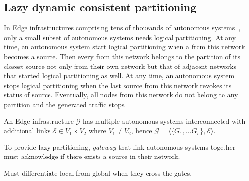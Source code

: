 

\subsection{Lazy dynamic consistent partitioning}
\label{subsec:lazy}

In Edge infrastructures comprising tens of thousands of autonomous
systems~\cite{nur2018crossas}, only a small subset of autonomous
systems needs logical partitioning. At any time, an autonomous system
start logical partitioning when a \process from this network becomes a
source.  Then every \process from this network belongs to the
partition of its closest source not only from their own network but
that of adjacent networks that started logical partitioning as well.
At any time, an autonomous system stops logical partitioning when the
last source from this network revokes its status of
source. Eventually, all nodes from this network do not belong to any
partition and the generated traffic stops.

\begin{definition}
  An Edge infrastructure $\mathcal{G}$ has multiple autonomous systems
  interconnected with additional links $\mathcal{E} \in V_1 \times
  V_2$ where $V_1 \neq V_2$, hence $\mathcal{G} = \langle \{G_1,
  \ldots G_n\}, \mathcal{E} \rangle$.
\end{definition}

\begin{definition}
  
\end{definition}

To provide lazy partitioning, \emph{gateway} \nodes that link
autonomous systems together must acknowledge if there exists a source
in their network.

Must differentiate local from global when they cross the gates.





